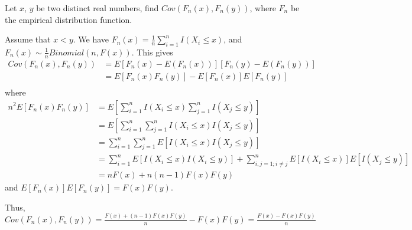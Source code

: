 \begin{problem}
    Let $x$, $y$ be two distinct real numbers, find $Cov(F_n(x),F_n(y))$, where $ F_n $ be the empirical distribution function. 
\end{problem}
\begin{solution}
    Assume that $x<y$. 
    We have $F_n (x)=\frac{1}{n} \sum_{i=1}^n I(X_i \le x)$, and $F_n (x)\sim \frac{1}{n} Binomial(n, F(x))$.
    This gives
    \begin{equation*}
        \begin{split}
            Cov(F_n(x),F_n(y)) & = E[F_n (x)-E(F_n (x))][F_n (y)-E(F_n (y))] \\
            & = E[F_n (x) F_n (y)] - E[F_n(x)]E[F_n(y)] \\
        \end{split}
    \end{equation*} 
    where 
    \begin{equation*}
        \begin{split}
            n^2 E[F_n (x) F_n (y)] & = E\left[ \sum_{i=1}^n I(X_i\le x) \sum_{j=1}^n I(X_j\le y) \right] \\
            & = E\left[  \sum_{i=1}^n \sum_{j=1}^n  I(X_i\le x) I(X_j\le y) \right] \\
            & = \sum_{i=1}^n \sum_{j=1}^n E\left[ I(X_i\le x) I(X_j\le y) \right] \\
            & = \sum_{i=1}^n E\left[ I(X_i\le x)I(X_i\le y) \right] + \sum_{i,j=1; i\neq j}^n  E\left[ I(X_i\le x)\right]  E\left[ I(X_j\le y)\right] \\
            & = n F(x) +  n(n-1)F(x)F(y) 
        \end{split} 
    \end{equation*}
    and 
    $E[F_n(x)]E[F_n(y)] = F(x)F(y)$.

    Thus, $Cov(F_n(x),F_n(y)) = \frac{F(x) +  (n-1)F(x)F(y)}{n} - F(x)F(y) =\frac{F(x) - F(x)F(y)}{n}  $
\end{solution}




